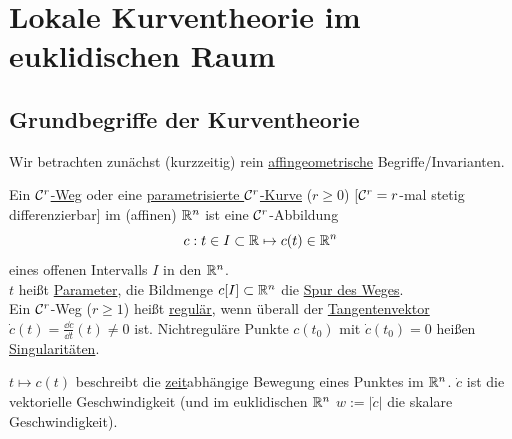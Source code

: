\chapter{Lokale Kurventheorie im euklidischen Raum}
\section{Grundbegriffe der Kurventheorie}
Wir betrachten zunächst (kurzzeitig) rein \uline{affingeometrische} Begriffe/Invarianten.
\begin{definition}
 Ein \uline{\(\mathcal{C}^r\)-Weg} oder eine \uline{parametrisierte \(\mathcal{C}^r\)-Kurve} (\(r\ge 0\)) [\(\mathcal{C}^r = r\)-mal stetig differenzierbar] im (affinen) \(\mathbb{R}^n\) ist eine \(\mathcal{C}^r\)-Abbildung 
\[
 c: t\in I \subset \mathbb{R} \mapsto c(t)\in \mathbb{R}^n
\]
eines offenen Intervalls \(I\) in den \(\mathbb{R}^n\). \\
\(t\) heißt \uline{Parameter}, die Bildmenge \(c[I] \subset \mathbb{R}^n\) die \uline{Spur des Weges}. \\
Ein \(\mathcal{C}^r\)-Weg (\(r\ge 1\)) heißt \uline{regulär}, wenn überall der \uline{Tangentenvektor} \(\dot c(t) = \frac{\dd c}{\dd t}(t) \ne 0\) ist. Nichtreguläre Punkte \(c(t_0)\) mit \(\dot c(t_0)=0\) heißen \uline{Singularitäten}.
\end{definition}
\begin{kin}
\(t \mapsto c(t)\) beschreibt die \uline{zeit}abhängige Bewegung eines Punktes im \(\mathbb{R}^n\).
\(\dot c\) ist die vektorielle Geschwindigkeit (und im euklidischen \(\mathbb{R}^n\) \(w:= | \dot c|\) die skalare Geschwindigkeit).
\end{kin}
